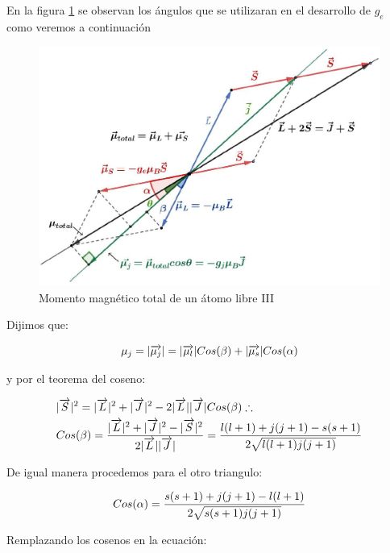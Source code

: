 En la figura \ref{fig:119} se observan los ángulos que se utilizaran en el desarrollo de $g_{e}$ como veremos a continuación

\begin{figure}[H]
    \centering
    \includegraphics[width=1.0\textwidth]{./Figures/fig119}
	\caption{Momento magnético total de un átomo libre III}
	\label{fig:119}
 \end{figure}
 
Dijimos que:
 
\begin{equation*}
	\mu_{j}=\vert \overrightarrow{\mu_{j}} \vert=\vert \overrightarrow{\mu_{l}} \vert Cos(\beta)+\vert \overrightarrow{\mu_{s}} \vert Cos(\alpha)
\end{equation*} 

y por el teorema del coseno:

\begin{equation*}
	\begin{aligned}[c]
	&\vert \overrightarrow{S} \vert^{2}=\vert \overrightarrow{L} \vert^{2}+\vert \overrightarrow{J} \vert^{2}-2\vert \overrightarrow{L} \vert\vert \overrightarrow{J} \vert Cos(\beta)\therefore \\
	&Cos(\beta)=\dfrac{\vert \overrightarrow{L} \vert^{2}+\vert \overrightarrow{J} \vert^{2}-\vert \overrightarrow{S} \vert^{2}}{2\vert \overrightarrow{L} \vert\vert \overrightarrow{J} \vert}= \dfrac{l(l + 1)+j(j + 1)-s(s + 1)}{2\sqrt{l(l + 1)j(j + 1)}}
	\end{aligned}
\end{equation*} 

De igual manera procedemos para el otro triangulo:

\begin{equation*}
Cos(\alpha)= \dfrac{s(s + 1)+j(j + 1)-l(l + 1)}{2\sqrt{s(s + 1)j(j + 1)}}
\end{equation*} 

Remplazando los cosenos en la ecuación:

